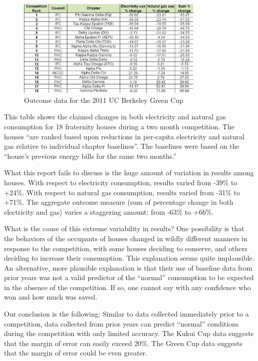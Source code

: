 \documentclass[jou]{apa} %
\begin{document}
\begin{figure}[htbp]
\begin{center}
\includegraphics[width=0.8\textwidth]{ucb-green-cup.png.eps}
\caption{Outcome data for the 2011 UC Berkeley Green Cup}
\label{fig:ucb-green-cup}
\end{center}
\end{figure}

This table shows the claimed changes in both electricity and natural gas consumption for
18 fraternity houses during a two month competition.  The houses ``are ranked based upon
reductions in per-capita electricity and natural gas relative to individual chapter
baselines''.  The baselines were based on the ``house's previous energy bills for the same
two months.''  

What this report fails to discuss is the huge amount of variation in results among
houses. With respect to electricity consumption, results varied from -39\% to +24\%.  With
respect to natural gas consumption, results varied from -31\% to +71\%.  The aggregate
outcome measure (sum of percentage change in both electricity and gas) varies a staggering
amount: from -63\% to +66\%.  

What is the cause of this extreme variability in results?  One possibility is that the behaviors
of the occupants of houses changed in wildly different manners in response to the
competition, with some houses deciding to conserve, and others deciding to increase
their consumption.  This explanation seems quite implausible.  An alternative, more plausible
explanation is that their use of baseline data from prior years was not a valid predictor of
the ``normal'' consumption to be expected in the absence of the competition. If so, one
cannot say with any confidence who won and how much was saved. 

Our conclusion is the following: Similar to data collected immediately prior to a
competition, data collected from prior years can predict ``normal'' conditions during the
competition with only limited accuracy.  The Kukui Cup data suggests that the margin of error can easily
exceed 20\%.  The Green Cup data suggests that the margin of error could be even greater. 
\end{document}
